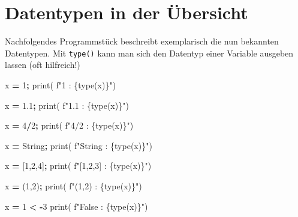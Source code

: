 \documentclass[
  oneside]{book}
\newenvironment{Shaded}{\begin{snugshade}}{\end{snugshade}}
\newcommand{\BuiltInTok}[1]{#1}
\newcommand{\DecValTok}[1]{\textcolor[rgb]{0.00,0.00,0.81}{#1}}
\newcommand{\FloatTok}[1]{\textcolor[rgb]{0.00,0.00,0.81}{#1}}
\newcommand{\NormalTok}[1]{#1}
\newcommand{\OperatorTok}[1]{\textcolor[rgb]{0.81,0.36,0.00}{\textbf{#1}}}
\newcommand{\SpecialCharTok}[1]{\textcolor[rgb]{0.00,0.00,0.00}{#1}}
\newcommand{\SpecialStringTok}[1]{\textcolor[rgb]{0.31,0.60,0.02}{#1}}
\newcommand{\StringTok}[1]{\textcolor[rgb]{0.31,0.60,0.02}{#1}}
\begin{document}
\hypertarget{datentypen-in-der-uxfcbersicht}{%
\section{Datentypen in der Übersicht}\label{datentypen-in-der-uxfcbersicht}}

Nachfolgendes Programmstück beschreibt exemplarisch die nun bekannten Datentypen. Mit \texttt{type()} kann man sich den Datentyp einer Variable ausgeben lassen (oft hilfreich!)

\begin{Shaded}
\begin{Highlighting}[]
\NormalTok{x }\OperatorTok{=} \DecValTok{1}\OperatorTok{;} 
\BuiltInTok{print}\NormalTok{( }\SpecialStringTok{f"1 : }\SpecialCharTok{\{}\BuiltInTok{type}\NormalTok{(x)}\SpecialCharTok{\}}\SpecialStringTok{"}\NormalTok{)}

\NormalTok{x }\OperatorTok{=} \FloatTok{1.1}\OperatorTok{;} 
\BuiltInTok{print}\NormalTok{( }\SpecialStringTok{f"1.1 : }\SpecialCharTok{\{}\BuiltInTok{type}\NormalTok{(x)}\SpecialCharTok{\}}\SpecialStringTok{"}\NormalTok{)}

\NormalTok{x }\OperatorTok{=} \DecValTok{4}\OperatorTok{/}\DecValTok{2}\OperatorTok{;} 
\BuiltInTok{print}\NormalTok{( }\SpecialStringTok{f"4/2 : }\SpecialCharTok{\{}\BuiltInTok{type}\NormalTok{(x)}\SpecialCharTok{\}}\SpecialStringTok{"}\NormalTok{)}

\NormalTok{x }\OperatorTok{=} \StringTok{\textquotesingle{}String\textquotesingle{}}\OperatorTok{;} 
\BuiltInTok{print}\NormalTok{( }\SpecialStringTok{f"\textquotesingle{}String\textquotesingle{} : }\SpecialCharTok{\{}\BuiltInTok{type}\NormalTok{(x)}\SpecialCharTok{\}}\SpecialStringTok{"}\NormalTok{)}

\NormalTok{x }\OperatorTok{=}\NormalTok{ [}\DecValTok{1}\NormalTok{,}\DecValTok{2}\NormalTok{,}\DecValTok{4}\NormalTok{]}\OperatorTok{;} 
\BuiltInTok{print}\NormalTok{( }\SpecialStringTok{f"[1,2,3] : }\SpecialCharTok{\{}\BuiltInTok{type}\NormalTok{(x)}\SpecialCharTok{\}}\SpecialStringTok{"}\NormalTok{)}

\NormalTok{x }\OperatorTok{=}\NormalTok{ (}\DecValTok{1}\NormalTok{,}\DecValTok{2}\NormalTok{)}\OperatorTok{;}
\BuiltInTok{print}\NormalTok{( }\SpecialStringTok{f"(1,2) : }\SpecialCharTok{\{}\BuiltInTok{type}\NormalTok{(x)}\SpecialCharTok{\}}\SpecialStringTok{"}\NormalTok{)}

\NormalTok{x }\OperatorTok{=} \DecValTok{1} \OperatorTok{\textless{}} \OperatorTok{{-}}\DecValTok{3}
\BuiltInTok{print}\NormalTok{( }\SpecialStringTok{f"False : }\SpecialCharTok{\{}\BuiltInTok{type}\NormalTok{(x)}\SpecialCharTok{\}}\SpecialStringTok{"}\NormalTok{)}
\end{Highlighting}
\end{Shaded}
\end{document}
